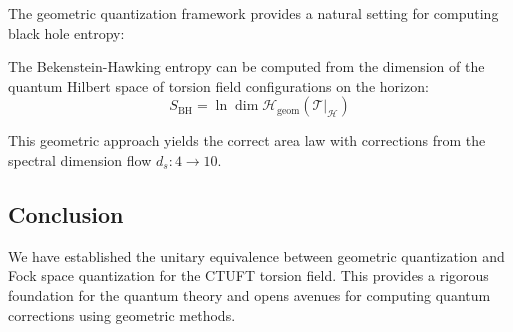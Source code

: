 The geometric quantization framework provides a natural setting for computing black hole entropy:

\begin{theorem}
The Bekenstein-Hawking entropy can be computed from the dimension of the quantum Hilbert space of torsion field configurations on the horizon:
\begin{equation}
    S_{\text{BH}} = \ln \dim \mathcal{H}_{\text{geom}}(\mathcal{T}|_{\mathcal{H}})
\end{equation}
\end{theorem}

This geometric approach yields the correct area law with corrections from the spectral dimension flow $d_s : 4 \to 10$.

\subsection{Conclusion}

We have established the unitary equivalence between geometric quantization and Fock space quantization for the CTUFT torsion field. This provides a rigorous foundation for the quantum theory and opens avenues for computing quantum corrections using geometric methods.
